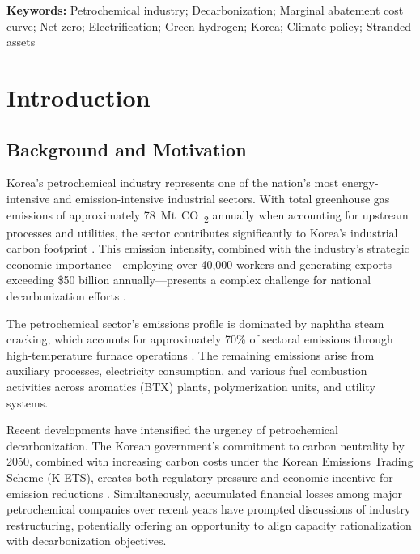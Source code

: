 \documentclass[12pt,a4paper]{article}
\newcommand{\COtwo}{CO\textsubscript{2}}
\begin{document}
\vspace{0.5cm}
\textbf{Keywords:} Petrochemical industry; Decarbonization; Marginal abatement cost curve; Net zero; Electrification; Green hydrogen; Korea; Climate policy; Stranded assets

\newpage
\tableofcontents
\newpage

\section{Introduction}

\subsection{Background and Motivation}

Korea's petrochemical industry represents one of the nation's most energy-intensive and emission-intensive industrial sectors. With total greenhouse gas emissions of approximately \SI{78}{Mt~\COtwo} annually when accounting for upstream processes and utilities, the sector contributes significantly to Korea's industrial carbon footprint \citep{kpia2024}. This emission intensity, combined with the industry's strategic economic importance---employing over 40,000 workers and generating exports exceeding \$50 billion annually---presents a complex challenge for national decarbonization efforts \citep{motie2023}.

The petrochemical sector's emissions profile is dominated by naphtha steam cracking, which accounts for approximately 70\% of sectoral emissions through high-temperature furnace operations \citep{iea2018}. The remaining emissions arise from auxiliary processes, electricity consumption, and various fuel combustion activities across aromatics (BTX) plants, polymerization units, and utility systems.

Recent developments have intensified the urgency of petrochemical decarbonization. The Korean government's commitment to carbon neutrality by 2050, combined with increasing carbon costs under the Korean Emissions Trading Scheme (K-ETS), creates both regulatory pressure and economic incentive for emission reductions \citep{motie2023}. Simultaneously, accumulated financial losses among major petrochemical companies over recent years have prompted discussions of industry restructuring, potentially offering an opportunity to align capacity rationalization with decarbonization objectives.
\end{document}
